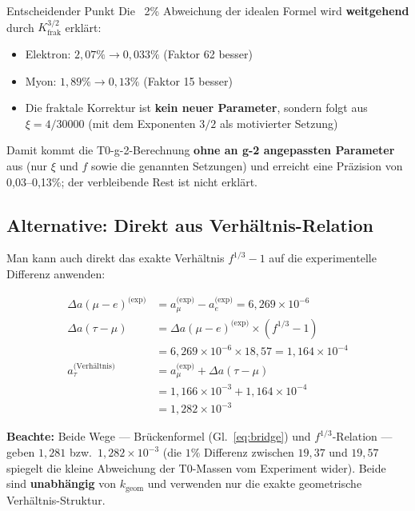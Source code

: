 	\begin{important}{Entscheidender Punkt}
		Die ~2\% Abweichung der idealen Formel wird \textbf{weitgehend} durch $K_\text{frak}^{3/2}$ erklärt:
		\begin{itemize}
			\item Elektron: $2{,}07\% \to 0{,}033\%$ (Faktor 62 besser)
			\item Myon: $1{,}89\% \to 0{,}13\%$ (Faktor 15 besser)
			\item Die fraktale Korrektur ist \textbf{kein neuer Parameter}, sondern folgt aus $\xi = 4/30000$ (mit dem Exponenten $3/2$ als motivierter Setzung)
		\end{itemize}
		
		Damit kommt die T0-g-2-Berechnung \textbf{ohne an g-2 angepassten Parameter} aus (nur $\xi$ und $f$ sowie die genannten Setzungen) und erreicht eine Präzision von 0{,}03--0{,}13\%; der verbleibende Rest ist nicht erklärt.
	\end{important}
	
	\subsection{Alternative: Direkt aus Verhältnis-Relation}
	
	Man kann auch direkt das exakte Verhältnis $f^{1/3} - 1$ auf die experimentelle Differenz anwenden:
	
	\begin{align}
		\Delta a(\mu-e)^{\text{(exp)}} &= a_\mu^{\text{(exp)}} - a_e^{\text{(exp)}} = 6{,}269 \times 10^{-6} \\
		\Delta a(\tau-\mu) &= \Delta a(\mu-e)^{\text{(exp)}} \times (f^{1/3} - 1) \\
		&= 6{,}269 \times 10^{-6} \times 18{,}57 = 1{,}164 \times 10^{-4} \\
		a_\tau^{\text{(Verhältnis)}} &= a_\mu^{\text{(exp)}} + \Delta a(\tau-\mu) \\
		&= 1{,}166 \times 10^{-3} + 1{,}164 \times 10^{-4} \\
		&= \boxed{1{,}282 \times 10^{-3}}
	\end{align}
	
	\textbf{Beachte:} Beide Wege — Brückenformel (Gl.~\ref{eq:bridge}) und $f^{1/3}$-Relation — geben $1{,}281$ bzw.\ $1{,}282 \times 10^{-3}$ (die $1\%$ Differenz zwischen $19{,}37$ und $19{,}57$ spiegelt die kleine Abweichung der T0-Massen vom Experiment wider). Beide sind \textbf{unabhängig} von $k_{\text{geom}}$ und verwenden nur die exakte geometrische Verhältnis-Struktur.
	
